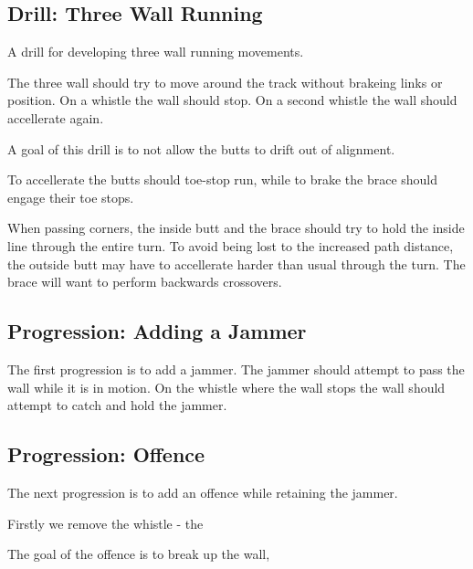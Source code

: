 \subsection*{Drill: Three Wall Running} 
\label{drill:three_wall:running}

A drill for developing three wall running movements.

The three wall should try to move around the track without brakeing links or position.
On a whistle the wall should stop.
On a second whistle the wall should accellerate again. 

A goal of this drill is to not allow the butts to drift out of alignment.

To accellerate the butts should toe-stop run, while to brake the brace should engage their toe stops.

When passing corners, the inside butt and the brace should try to hold the inside line through the entire turn.
To avoid being lost to the increased path distance, the outside butt may have to accellerate harder than usual through the turn.  
The brace will want to perform backwards crossovers.
 

\subsection*{Progression: Adding a Jammer}
\label{drill:three_wall:running:jammer}

The first progression is to add a jammer.
The jammer should attempt to pass the wall while it is in motion.
On the whistle where the wall stops the wall should attempt to catch and hold the jammer.


\subsection*{Progression: Offence}
The next progression is to add an offence while retaining the jammer. 

Firstly we remove the whistle - the  

The goal of the offence is to break up the wall,  

